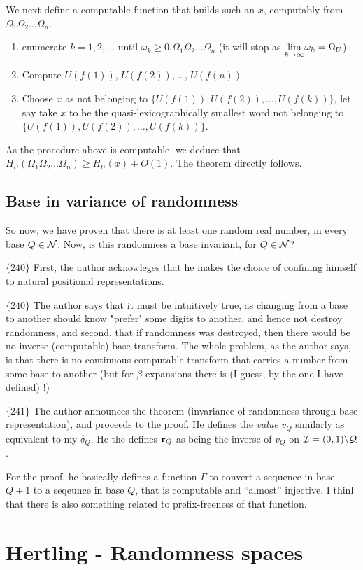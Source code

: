 \documentclass{article}
\begin{document}
We next define a computable function that builds such an $x$, computably from $\Omega_1 \Omega_2\ldots\Omega_n$. 
\begin{enumerate}
    \item enumerate $k = 1,2, \ldots$ until $\omega_k \geq 0. \Omega_1\Omega_2\ldots\Omega_n$ (it will stop as $\underset{k \to \infty}{\lim}\omega_k = \Omega_U$)
    \item Compute $U(f(1))$, $U(f(2))$, \ldots, $U(f(n))$
    \item Choose $x$ as not belonging to $\{U(f(1)), U(f(2)), \ldots, U(f(k))\}$, let say take $x$ to be the quasi-lexicographically smallest word not belonging to $\{U(f(1)), U(f(2)), \ldots, U(f(k))\}$.
\end{enumerate}
\begin{lemma}
    As the procedure above is computable, we deduce that $H_U(\Omega_1 \Omega_2\ldots\Omega_n) \geq H_U(x) + O(1)$. The theorem directly follows.
\end{lemma}

\subsection{Base in variance of randomness}

So now, we have proven that there is at least one random real number, in every base $Q \in \mathcal{N}$. Now, is this randomness a base invariant, for $Q \in \mathcal{N}$?

$\{240\}$ First, the author acknowleges that he makes the choice of confining himself to natural positional representations. 

$\{240\}$ The author says that it must be intuitively true, as changing from a base to another should know "prefer" some digits to another, and hence not destroy randomness, and second, that if randomness was destroyed, then there would be no inverse (computable) base transform. The whole problem, as the author says, is that there is no continuous computable transform that carries a number from some base to another (but for $\beta$-expansions there is (I guess, by the one I have defined) !)

$\{241\}$ The author announces the theorem (invariance of randomness through base representation), and proceeds to the proof. He defines the \textit{value} $v_Q$ similarly as equivalent to my $\delta_Q$. He the defines ${\bf r}_Q$ as being the inverse of $v_Q$ on $\mathcal{I} = (0,1)\backslash\mathcal{Q}$.

For the proof, he basically defines a function $\Gamma$ to convert a sequence in base $Q+1$ to a seqeunce in base $Q$, that is computable and ``almost'' injective. I thinl that there is also something related to prefix-freeness of that function.

\section{Hertling - Randomness spaces}





{}

\end{document}
